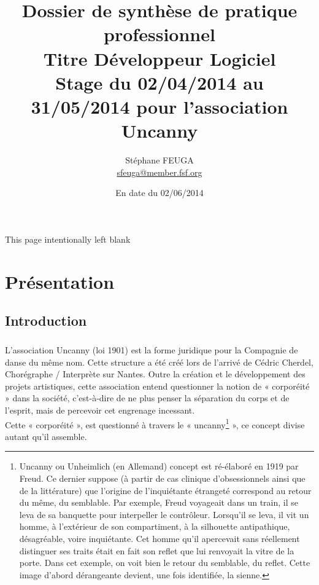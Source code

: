 \documentclass[11pt,a4paper]{report}
\author{Stéphane FEUGA\\{\small \href{mailto:sfeuga@member.fsf.org}{sfeuga@member.fsf.org}}}
\title{{\Huge Dossier de synthèse de pratique professionnel\\
Titre Développeur Logiciel}\\
{\normalsize Stage du 02/04/2014 au 31/05/2014 pour l'association Uncanny}}
\date {En date du 02/06/2014}
\begin{document}
\maketitle

\begin{center}
This page intentionally left blank
\thispagestyle{empty}
\end{center}

\tableofcontents

\chapter{Présentation}
	\section{Introduction}
		\paragraph*{}L'association Uncanny (loi 1901) est la forme juridique pour la Compagnie de danse du même nom. Cette structure a été créé lors de l'arrivé de Cédric Cherdel, Chorégraphe / Interprète sur Nantes. Outre la création et le développement des projets artistiques, cette association entend questionner la notion de « corporéité » dans la société, c'est-à-dire de ne plus penser la séparation du corps et de l'esprit, mais de percevoir cet engrenage incessant.\\
		Cette « corporéité », est questionné à travers le « uncanny\footnote{Uncanny ou Unheimlich (en Allemand) concept est ré-élaboré en 1919 par Freud. Ce dernier suppose (à partir de cas clinique d'obsessionnels ainsi que de la littérature) que l'origine de l'inquiétante étrangeté correspond au retour du même, du semblable. Par exemple, Freud voyageait dans un train, il se leva de sa banquette pour interpeller le contrôleur. Lorsqu'il se leva, il vit un homme, à l'extérieur de son compartiment, à la silhouette antipathique, désagréable, voire inquiétante. Cet homme qu'il apercevait sans réellement distinguer ses traits était en fait son reflet que lui renvoyait la vitre de la porte. Dans cet exemple, on voit bien le retour du semblable, du reflet. Cette image d'abord dérangeante devient, une fois identifiée, la sienne.} », ce concept divise autant qu'il assemble.
\end{document}
